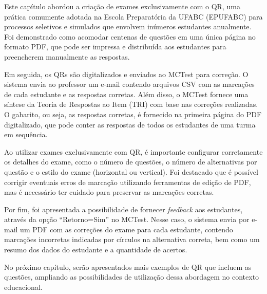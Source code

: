 Este capítulo abordou a criação de exames exclusivamente com o QR, uma prática comumente adotada na Escola Preparatória da UFABC (EPUFABC) para processos seletivos e simulados que envolvem inúmeros estudantes anualmente. Foi demonstrado como acomodar centenas de questões em uma única página no formato PDF, que pode ser impressa e distribuída aos estudantes para preencherem manualmente as respostas.

Em seguida, os QRs são digitalizados e enviados ao MCTest para correção. O sistema envia ao professor um e-mail contendo arquivos CSV com as marcações de cada estudante e as respostas corretas. Além disso, o MCTest fornece uma síntese da Teoria de Respostas ao Item (TRI) com base nas correções realizadas. O gabarito, ou seja, as respostas corretas, é fornecido na primeira página do PDF digitalizado, que pode conter as respostas de todos os estudantes de uma turma em sequência.

Ao utilizar exames exclusivamente com QR, é importante configurar corretamente os detalhes do exame, como o número de questões, o número de alternativas por questão e o estilo do exame (horizontal ou vertical). Foi destacado que é possível corrigir eventuais erros de marcação utilizando ferramentas de edição de PDF, mas é necessário ter cuidado para preservar as marcações corretas.

Por fim, foi apresentada a possibilidade de fornecer \textit{feedback} aos estudantes, através da opção ``Retorno=Sim'' no MCTest. Nesse caso, o sistema envia por e-mail um PDF com as correções do exame para cada estudante, contendo marcações incorretas indicadas por círculos na alternativa correta, bem como um resumo dos dados do estudante e a quantidade de acertos.

No próximo capítulo, serão apresentados mais exemplos de QR que incluem as questões, ampliando as possibilidades de utilização dessa abordagem no contexto educacional.

















